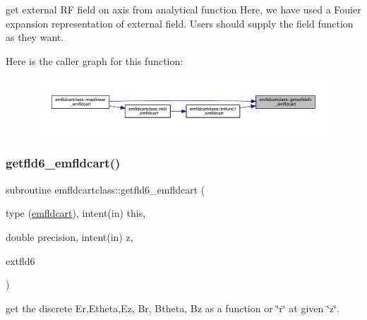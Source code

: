 get external RF field on axis from analytical function Here, we have used a Fouier expansion representation of external field. Users should supply the field function as they want. 

Here is the caller graph for this function\+:\nopagebreak
\begin{figure}[H]
\begin{center}
\leavevmode
\includegraphics[width=350pt]{namespaceemfldcartclass_abe4d0916e2997f8145abad1eb026ea9d_icgraph}
\end{center}
\end{figure}
\mbox{\label{namespaceemfldcartclass_a099681f57177c62b1715bde0b0fe93bb}} 
\subsubsection{\texorpdfstring{getfld6\_emfldcart()}{getfld6\_emfldcart()}}
{\footnotesize\ttfamily subroutine emfldcartclass\+::getfld6\+\_\+emfldcart (\begin{DoxyParamCaption}\item[{type (\mbox{\hyperlink{namespaceemfldcartclass_structemfldcartclass_1_1emfldcart}{emfldcart}}), intent(in)}]{this,  }\item[{double precision, intent(in)}]{z,  }\item[{}]{extfld6 }\end{DoxyParamCaption})}



get the discrete Er,Etheta,Ez, Br, Btheta, Bz as a function or \char`\"{}r\char`\"{} at given \char`\"{}z\char`\"{}. 

\mbox{\label{namespaceemfldcartclass_a1b849dab96a221608dde6ea08028e459}} 
